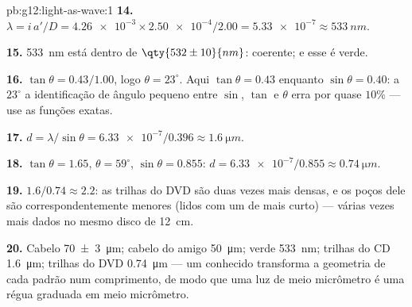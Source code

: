 \begin{solution}{pb:g12:light-as-wave:1}
\textbf{14.} $\lambda = i\,a'/D = \num{4.26e-3} \times
\num{2.50e-4}/2.00 = \num{5.33e-7} \approx \qty{533}{nm}$.

\textbf{15.} \qty{533}{nm} está dentro de $\qty{532 \pm 10}{nm}$:
coerente; e esse  é verde.

\textbf{16.} $\tan\theta = 0.43/1.00$, logo $\theta = 23^\circ$. Aqui
$\tan\theta = 0.43$ enquanto $\sin\theta = 0.40$: a $23^\circ$ a
identificação de ângulo pequeno entre $\sin$, $\tan$ e $\theta$ erra por
quase $10\%$ --- use as funções exatas.

\textbf{17.} $d = \lambda/\sin\theta = \num{6.33e-7}/0.396 \approx
\qty{1.6}{\micro m}$.

\textbf{18.} $\tan\theta = 1.65$, $\theta = 59^\circ$,
$\sin\theta = 0.855$: $d = \num{6.33e-7}/0.855 \approx
\qty{0.74}{\micro m}$.

\textbf{19.} $1.6/0.74 \approx 2.2$: as trilhas do DVD são duas vezes
mais densas, e os poços dele são correspondentemente menores (lidos com
um  de  mais curto) --- várias vezes mais dados
no mesmo disco de \qty{12}{cm}.

\textbf{20.} Cabelo \qty{70 \pm 3}{\micro m}; cabelo do amigo
\qty{50}{\micro m};  verde \qty{533}{nm}; trilhas do CD
\qty{1.6}{\micro m}; trilhas do DVD \qty{0.74}{\micro m} --- um
 conhecido transforma a geometria de cada padrão num
comprimento, de modo que uma luz de meio micrômetro é uma régua graduada
em meio micrômetro.
\end{solution}
